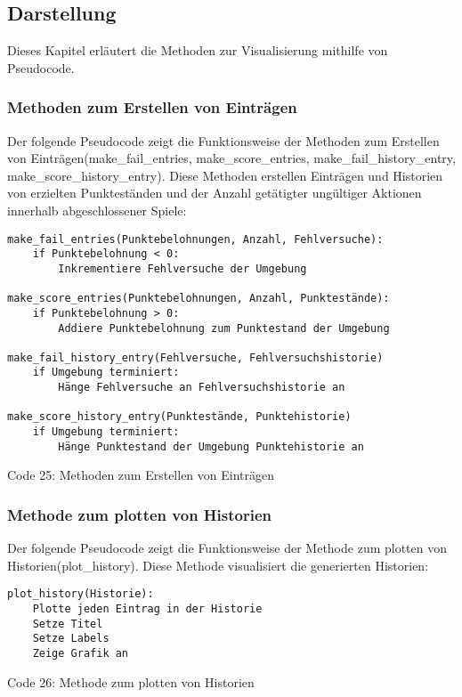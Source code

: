 \subsection{Darstellung}
Dieses Kapitel erläutert die Methoden zur Visualisierung mithilfe von Pseudocode.
\subsubsection{Methoden zum Erstellen von Einträgen}
\begin{minipage}{\linewidth}
Der folgende Pseudocode zeigt die Funktionsweise der Methoden zum Erstellen von Einträgen(make\_fail\_entries, make\_score\_entries, make\_fail\_history\_entry, make\_score\_history\_entry). Diese Methoden erstellen Einträgen und Historien von erzielten Punkteständen und der Anzahl getätigter ungültiger Aktionen innerhalb abgeschlossener Spiele:
\vspace{0.5cm}
\begin{lstlisting}
make_fail_entries(Punktebelohnungen, Anzahl, Fehlversuche):
	if Punktebelohnung < 0:
		Inkrementiere Fehlversuche der Umgebung

make_score_entries(Punktebelohnungen, Anzahl, Punktestände):
	if Punktebelohnung > 0:
		Addiere Punktebelohnung zum Punktestand der Umgebung

make_fail_history_entry(Fehlversuche, Fehlversuchshistorie)
	if Umgebung terminiert:
		Hänge Fehlversuche an Fehlversuchshistorie an
		
make_score_history_entry(Punktestände, Punktehistorie)
	if Umgebung terminiert:
		Hänge Punktestand der Umgebung Punktehistorie an
\end{lstlisting}
Code 25: Methoden zum Erstellen von Einträgen\\
\end{minipage}
\subsubsection{Methode zum plotten von Historien}
\begin{minipage}{\linewidth}
Der folgende Pseudocode zeigt die Funktionsweise der Methode zum plotten von Historien(plot\_history). Diese Methode visualisiert die generierten Historien:
\vspace{0.5cm}
\begin{lstlisting}
plot_history(Historie):
	Plotte jeden Eintrag in der Historie
	Setze Titel
	Setze Labels
	Zeige Grafik an
\end{lstlisting}
Code 26: Methode zum plotten von Historien\\
\end{minipage}
